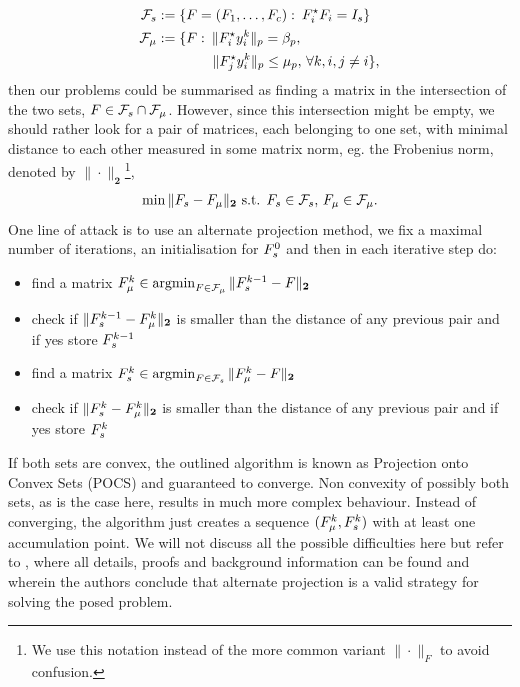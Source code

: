 \documentclass[11pt]{article}
\begin{document}
\begin{align}
\mathcal{{F}}_{{s}}&:=\{{F}=({F}_1, \ldots,{F}_c):\: {F}_i^\star{F}_i=I_{{s}} \}\notag\\
\mathcal{{F}}_\mu&:=\{{F}:\:  \|{F}^\star_i {y}_i^k\|_p=\beta_p,\,  \notag \\
& \hspace{4em} \|{F}^\star_j {y}_i^k\|_p \leq \mu_p,\,\forall k,i,j\neq i \},
\end{align}
then our problems could be summarised as finding a matrix in the intersection of the two sets, \ie
$ {F} \in \mathcal{{F}}_{{s}} \cap \mathcal{{F}}_\mu$.
However, since this intersection might be empty, we should rather look for a pair of matrices, each belonging to one set, with minimal distance to each other measured in some matrix norm, eg. the Frobenius norm, denoted by $\|\cdot\|_{\mathbf{2}}$\footnote{We use this notation instead of the more common variant $\|\cdot\|_F$ to avoid confusion.},
\begin{align}
\min \| {F}_{s} - {F}_\mu\|_{\mathbf{2}} \mbox{ s.t. } {F}_{s} \in \mathcal{{F}}_{{s}},\, {F}_\mu \in \mathcal{{F}}_\mu.
\end{align}
One line of attack is to use an alternate projection method, \ie we fix a maximal number of iterations, an initialisation for ${F}^0_{{s}}$ and then in each iterative step do:
\begin{itemize}
\item find a matrix ${F}_{\mu}^k \in \operatorname*{argmin}_{{F}\in \mathcal{{F}}_\mu} \|{F}^{k-1}_{{s}}-{F}\|_{\mathbf{2}}$
\item check if $\|{F}^{k-1}_{{s}}-{F}_{\mu}^k\|_{\mathbf{2}}$ is smaller than the distance of any previous pair and if yes store ${F}^{k-1}_{{s}}$
\item find a matrix ${F}_{{s}}^k \in \operatorname*{argmin}_{{F}\in \mathcal{{F}}_{{s}}} \|{F}_{\mu}^k-{F}\|_{\mathbf{2}}$
\item check if $\|{F}^{k}_{{s}}-{F}_{\mu}^k\|_{\mathbf{2}}$ is smaller than the distance of any previous pair and if yes store ${F}^{k}_{{s}}$
\end{itemize}
If both sets are convex, the outlined algorithm is known as Projection onto Convex Sets (POCS) and guaranteed to converge. Non convexity of possibly both sets, as is the case here, results in much more complex behaviour. Instead of converging, the algorithm just creates a sequence $({F}_{\mu}^k,{F}_s^k)$ with at least one accumulation point. We will not discuss all the possible difficulties here but refer to \cite{trdhhest05}, where all details, proofs and background information can be found and wherein the authors conclude that alternate projection is a valid strategy for solving the posed problem.\\
\end{document}
